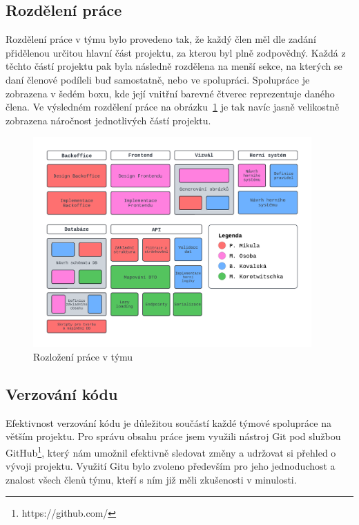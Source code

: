 \subsection{Rozdělení práce}
\label{subsec:implementation-collaboration-distribution}
Rozdělení práce v týmu bylo provedeno tak, že každý člen měl dle zadání přidělenou určitou hlavní část projektu, za kterou byl plně zodpovědný. Každá z těchto částí projektu pak byla následně rozdělena na menší sekce, na kterých se daní členové podíleli buď samostatně, nebo ve spolupráci. Spolupráce je zobrazena v šedém boxu, kde její vnitřní barevné čtverec reprezentuje daného člena. Ve výsledném rozdělení práce na obrázku~\ref{fig:job_distribution} je tak navíc jasně velikostně zobrazena náročnost jednotlivých částí projektu.

\begin{figure}[H]
    \centering
    \includegraphics[width=0.95\textwidth]{../../shared/diagrams/blocks}
    \caption{Rozložení práce v týmu}
    \label{fig:job_distribution}
\end{figure}

\subsection{Verzování kódu}
\label{subsec:implementation-collaboration-versioning}
Efektivnost verzování kódu je důležitou součástí každé týmové spolupráce na větším projektu. Pro správu obsahu práce jsem využili nástroj Git pod službou GitHub\footnote{https://github.com/}, který nám umožnil efektivně sledovat změny a udržovat si přehled o vývoji projektu. Využití Gitu bylo zvoleno především pro jeho jednoduchost a znalost všech členů týmu, kteří s ním již měli zkušenosti v minulosti.

